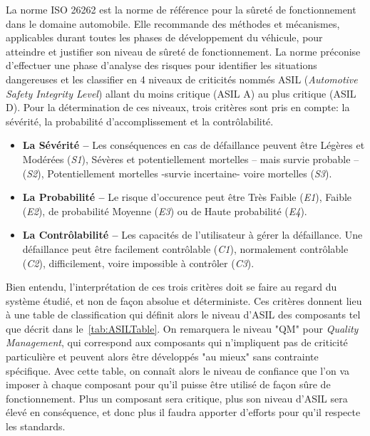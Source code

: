 \documentclass[french, a4paper, 11pt, twoside, pdftex]{StyleThese}
\begin{document}
		
		La norme ISO 26262 est la norme de référence pour la sûreté de fonctionnement dans le domaine automobile. Elle recommande des méthodes et mécanismes, applicables durant toutes les phases de développement du véhicule, pour atteindre et justifier son niveau de sûreté de fonctionnement. La norme préconise d’effectuer une phase d’analyse des risques pour identifier les situations dangereuses et les classifier en 4 niveaux de criticités nommés ASIL (\textit{Automotive Safety Integrity Level}) allant du moins critique (ASIL A) au plus critique (ASIL D). Pour la détermination de ces niveaux, trois critères sont pris en compte: la sévérité, la probabilité d'accomplissement et la contrôlabilité.
		
		\begin{itemize}
			\item 		\textbf{La Sévérité -- }
			Les conséquences en cas de défaillance peuvent être Légères et Modérées (\emph{S1}), Sévères et potentiellement mortelles -- mais survie probable -- (\emph{S2}), Potentiellement mortelles -survie incertaine- voire mortelles (\emph{S3}). 		
			\item 		\textbf{La Probabilité -- }
			Le risque d'occurence peut être Très Faible (\emph{E1}), Faible (\emph{E2}), de probabilité Moyenne (\emph{E3}) ou de Haute probabilité (\emph{E4}).
			\item 		\textbf{La Contrôlabilité -- }
			Les capacités de l'utilisateur à gérer la défaillance. Une défaillance peut être facilement contrôlable (\emph{C1}), normalement contrôlable (\emph{C2}), difficilement, voire impossible à contrôler (\emph{C3}).
		\end{itemize}
		
		Bien entendu, l'interprétation de ces trois critères doit se faire au regard du système étudié, et non de façon absolue et déterministe. 
		Ces critères donnent lieu à une table de classification qui définit alors le niveau d'ASIL des composants tel que décrit dans le~\autoref{tab:ASILTable}. On remarquera le niveau "QM" pour \textit{Quality Management}, qui correspond aux composants qui n'impliquent pas de criticité particulière et peuvent alors être développés "au mieux" sans contrainte spécifique. %
		Avec cette table, on connaît alors le niveau de confiance que l'on va imposer à chaque composant pour qu'il puisse être utilisé de façon sûre de fonctionnement. Plus un composant sera critique, plus son niveau d'ASIL sera élevé en conséquence, et donc plus il faudra apporter d'efforts pour qu'il respecte les standards.
\end{document}
